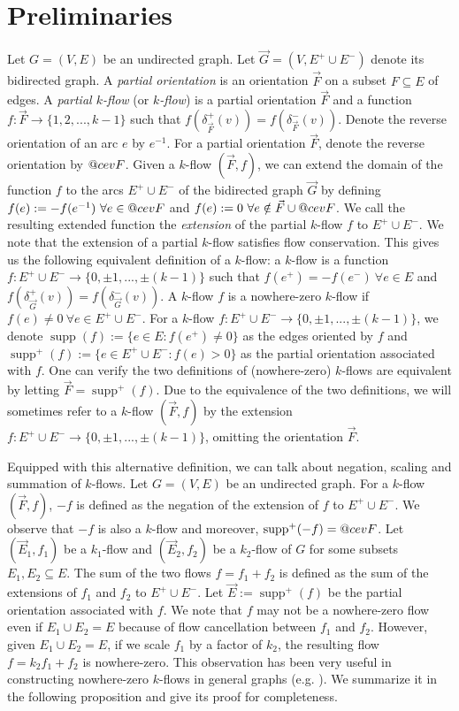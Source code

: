 \documentclass[11pt]{article}
\makeatletter
\DeclareRobustCommand{\cev}[1]{{\mathpalette\do@cev{#1}}}
\newcommand{\do@cev}[2]{\vbox{\offinterlineskip
    \sbox\z@{$\m@th#1 x$}\ialign{##\cr
      \hidewidth\reflectbox{$\m@th#1\vec{}\mkern4mu$}\hidewidth\cr
      \noalign{\kern-\ht\z@}
      $\m@th#1#2$\cr
    }}}
\DeclareMathOperator{\supp}{supp}
\makeatother
\begin{document}
\section{Preliminaries}\label{sec:basic}
Let $G=(V, E)$ be an undirected graph. Let $\vec{G}=(V,E^+\cup E^-)$ denote its bidirected graph. A \emph{partial orientation} is an orientation $\vec{F}$ on a subset $F\subseteq E$ of edges. A \emph{partial $k$-flow} (or \emph{$k$-flow}) is a partial orientation $\vec{F}$ and a function $f:\vec{F} \rightarrow \{1,2,...,k-1\}$ such that $f(\delta_{\vec{F}}^+(v))=f(\delta_{\vec{F}}^-(v))$. Denote the reverse orientation of an arc $e$ by $e^{-1}$. For a partial orientation $\vec{F}$, denote the reverse orientation by $\cev{F}$. Given a $k$-flow $(\vec{F},f)$, we can extend the domain of the function $f$ to the arcs $E^+\cup E^-$ of the bidirected graph $\vec{G}$ by defining $f(e):=-f(e^{-1}) \ \forall e\in \cev{F}$ and $f(e):=0 \ \forall e\notin \vec{F}\cup \cev{F}$. We call the resulting extended function the \emph{extension} of the partial $k$-flow $f$ to $E^+\cup E^-$. We note that the extension of a partial $k$-flow satisfies flow conservation. This gives us the following equivalent definition of a $k$-flow: a $k$-flow is a function $f:E^+\cup E^-\rightarrow \{0, \pm 1,...,\pm (k-1)\}$ such that $f(e^+)=-f(e^-)\ \forall e\in E$ and $f(\delta_{\vec{G}}^+(v))=f(\delta_{\vec{G}}^-(v))$. A $k$-flow $f$ is a nowhere-zero $k$-flow if $f(e)\neq 0\ \forall e\in E^+\cup E^-$. For a $k$-flow $f:E^+\cup E^-\rightarrow \{0, \pm 1,...,\pm (k-1)\}$, we denote $\supp(f):=\{e\in E: f(e^+)\neq 0\}$ as the edges oriented by $f$ and $\supp^+(f):=\{e\in E^+\cup E^-: f(e)>0\}$ as the partial orientation associated with $f$. One can verify the two definitions of (nowhere-zero) $k$-flows are equivalent by letting $\vec{F}=\supp^+(f)$. 
Due to the equivalence of the two definitions, we will sometimes refer to a $k$-flow $(\vec{F}, f)$ by the extension $f:E^+\cup E^-\rightarrow \{0, \pm 1,...,\pm (k-1)\}$, omitting the orientation $\vec{F}$.

Equipped with this alternative definition, we can talk about negation, scaling and summation of $k$-flows. Let $G=(V, E)$ be an undirected graph. For a $k$-flow $(\vec{F},f)$, $-f$ is defined as the negation of the extension of $f$ to $E^+\cup E^-$. We observe that $-f$ is also a $k$-flow and moreover, $\supp^+(-f)=\cev{F}$. Let $(\vec{E}_1,f_1)$ be a $k_1$-flow and $(\vec{E}_2,f_2)$ be a $k_2$-flow of $G$ for some subsets $E_1,E_2\subseteq E$. The sum of the two flows $f=f_1+f_2$ is defined as the sum of the extensions of $f_1$ and $f_2$ to $E^+\cup E^-$. Let $\vec{E}:=\supp^+(f)$ be the partial orientation associated with $f$. We note that $f$ may not be a nowhere-zero flow even if $E_1\cup E_2=E$ because of flow cancellation between $f_1$ and $f_2$. 
However, given $E_1\cup E_2=E$, if we scale $f_1$ by a factor of $k_2$, the resulting flow $f=k_2 f_1+f_2$ is nowhere-zero. This observation has been very useful in constructing nowhere-zero $k$-flows in general graphs (e.g. \cite{jaeger1976nowhere,jaeger1979flows,seymour1981nowhere}). We summarize it in the following proposition and give its proof for completeness.
\end{document}
